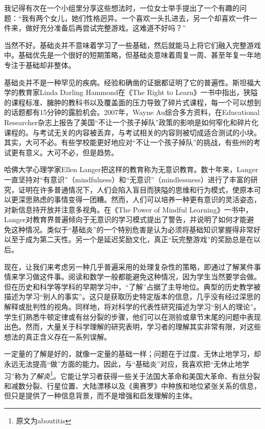 我记得有次在一个小组里分享这些想法时，一位女士举手提出了一个有趣的问题：“我有两个女儿，她们性格迥异。一个喜欢一头扎进去，另一个却喜欢一件一件来，做好充分准备后再尝试完整游戏。这难道不好吗？”

当然不好。基础炎并不意味着学习了一些基础，然后就能马上将它们融入完整游戏中。基础优先是一个很好的短期策略，但基础炎意味着周复一周、甚至年复一年地专注于基础却非整体。

基础炎并不是一种罕见的疾病。经验和确凿的证据都证明了它的普遍性。斯坦福大学的教育家Linda Darling Hammond在《The Right to Learn》一书中指出，狭隘的课程标准、臃肿的教科书以及覆盖面的压力导致了碎片式课程，每一个可以想到的话题都有15分钟的露脸机会。2007年，Wayne Au综合多方资料，在Educational Researcher杂志上报告了美国“不让一个孩子掉队”政策的影响是如何窄化和碎片化课程的。与考试无关的内容被丢弃，与考试相关的内容则被切成适合测试的小块。其实，大可不必。有些学校能更好地应对“不让一个孩子掉队”的挑战，有些州的考试更有意义。大可不必，但是趋势。

哈佛大学心理学家Ellen Langer把这样的教育称为无意识教育。数十年来，Langer一直坚持对“有意识”（mindfulness）和“无意识”（mindlessness）进行了丰富的研究，证明在许多普通情况下，人们会陷入盲目而狭隘的思维和行为模式，使原本可以更深思熟虑的事情变得一团糟。然而，人们可以培养一种更有意识的灵活姿态，对新信息持开放并注意多视角。在《The Power of Mindful Learning》一书中，Langer对教育界普遍倾向于无意识的学习模式提出了警告，并说明了如何才能避免这种情况。类似于“基础炎”的一个特别危害是认为必须将基础知识掌握得非常好以至于成为第二天性。另一个是延迟奖励文化，真正“玩完整游戏”的奖励总是在以后。

现在，让我们来考虑另一种几乎普遍采用的处理复杂性的策略，即通过了解某件事情来学习做这件事。阅读和数学一般都能避免这种情况，因为学生当然要学会做。但在历史和科学等学科的早期学习中，“了解”占据了主导地位。典型的历史教学被描述为学习“别人的事实”。这只是获取历史特定版本的信息，几乎没有经过深思的解释或批判性的视角。同样地，将对科学的代表性研究描述为学习“别人的理论”。学生们熟悉牛顿定律或有丝分裂的步骤，他们可以在测验或章节末尾的问题中表现出色。然而，大量关于科学理解的研究表明，学习者的理解其实非常有限，对这些想法的真正含义存在一系列误解。

一定量的了解是好的，就像一定量的基础一样；问题在于过度、无休止地学习，却永远无法提高“做”方面的能力。因此，与“基础炎”对应，我喜欢把“无休止地学习”称为\textit{了解炎}\footnote{原文为aboutitis}。它能让学习者获得一些关于法国大革命和美国大革命、有丝分裂和减数分裂、行星位置、大陆漂移以及《奥赛罗》中种族和地位紧张关系的信息，但只是提供了一种信息背景，而不是增强和启发理解的主体。

